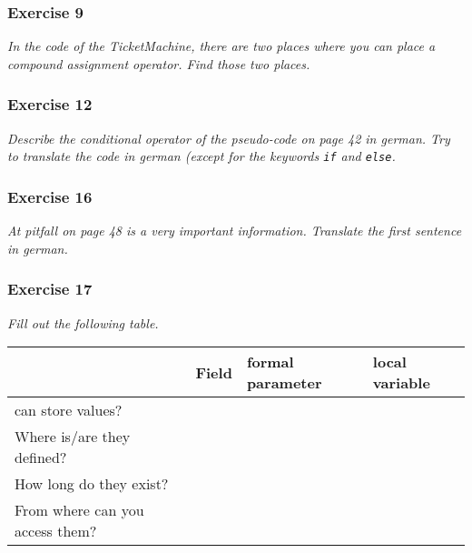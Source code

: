 \subsubsection*{Exercise 9}
\textit{In the code of the TicketMachine, there are two places where you
can place a compound assignment operator. Find those two
places.}\\

\subsubsection*{Exercise 12}
\textit{Describe the conditional operator of the pseudo-code on page 42
in german. Try to translate the code in german (except for the keywords
\lstinline{if} and \lstinline{else}.}\\

\subsubsection*{Exercise 16}
\textit{At pitfall on page 48 is a very important information.
Translate the first sentence in german.}\\

\subsubsection*{Exercise 17}
\textit{Fill out the following table.}\\

\begin{table}
\centering
\begin{tabular}{l | l | l | l}
& \textbf{Field}
& \textbf{formal parameter}
& \textbf{local variable} \\
\hline
can store values?
&
&
& \\
Where is/are they defined?
&
&
& \\
How long do they exist?
&
&
& \\
From where can you access them?
&
&
&
\end{tabular}
\end{table}
